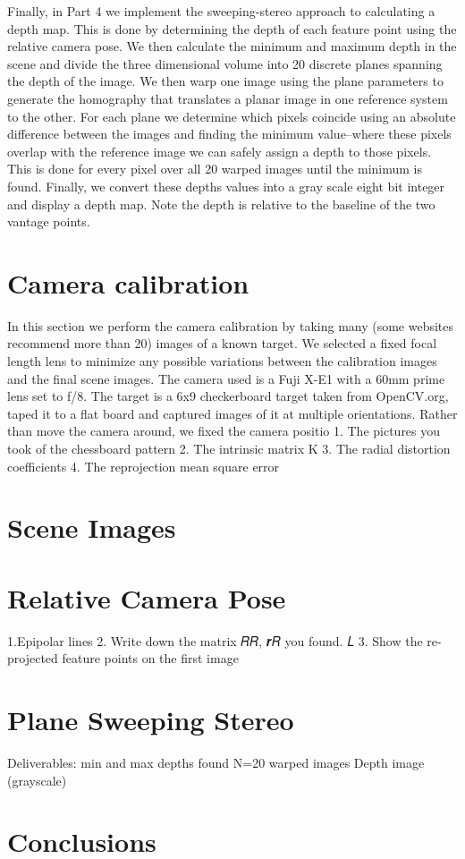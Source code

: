 \documentclass[a4paper]{article}
\begin{document}
Finally, in Part 4 we implement the sweeping-stereo approach to calculating a depth map.  This is done by determining the depth of each feature point using the relative camera pose.  We then calculate the minimum and maximum depth in the scene and divide the three dimensional volume into 20 discrete planes spanning the depth of the image. We then warp one image using the plane parameters to generate the homography that translates a planar image in one reference system to the other. For each plane we determine which pixels coincide using an absolute difference between the images and finding the minimum value--where these pixels overlap with the reference image we can safely assign a depth to those pixels.  This is done for every pixel over all 20 warped images until the minimum is found. Finally, we convert these depths values into a gray scale eight bit integer and display a depth map.  Note the depth is relative to the baseline of the two vantage points.
\section{Camera calibration}
In this section we perform the camera calibration by taking many (some websites recommend more than 20) images of a known target.  We selected a fixed focal length lens to minimize any possible variations between the calibration images and the final scene images. The camera used is a Fuji X-E1 with a 60mm prime lens set to f/8.  The target is a 6x9 checkerboard target taken from OpenCV.org, taped it to a flat board and captured images of it at multiple orientations.  Rather than move the camera around, we fixed the camera positio
1. The pictures you took of the chessboard pattern
2. The intrinsic matrix K
3. The radial distortion coefficients
4. The reprojection mean square error
\section{Scene Images}
\section{Relative Camera Pose}
1.Epipolar lines
2. Write down the matrix 𝑅𝑅, 𝒓𝑅 you found. 𝐿
 3. Show the re-projected feature points on the first image
\section{Plane Sweeping Stereo}

Deliverables:
min and max depths found
N=20 warped images
Depth image (grayscale)
\section{Conclusions}
\end{document}
